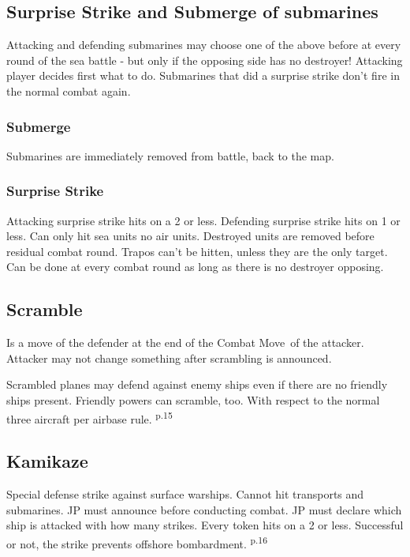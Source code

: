 \documentclass[10pt,a4paper,landscape]{article}
\begin{document}
\begin{multicols*}{3}
\subsection*{Surprise Strike and Submerge of submarines}
Attacking and defending submarines may choose one of the above before at every round of the sea battle - but only if the opposing side has no destroyer! Attacking player decides first what to do. Submarines that did a surprise strike don't fire in the normal combat again.

\subsubsection*{Submerge}
Submarines are immediately removed from battle, back to the map.

\subsubsection*{Surprise Strike}
Attacking surprise strike hits on a 2 or less. Defending surprise strike hits on 1 or less. Can only hit sea units no air units. Destroyed units are removed before residual combat round. Trapos can't be hitten, unless they are the only target. Can be done at every combat round as long as there is no destroyer opposing.

\subsection*{Scramble}
Is a move of the defender at the end of the \glqq Combat Move\grqq\ of the attacker. Attacker may not change something after scrambling is announced.

Scrambled planes may defend against enemy ships even if there are no friendly ships present. Friendly powers can scramble, too. With respect to the normal three aircraft per airbase rule. \textsuperscript{p.15}

\subsection*{Kamikaze}
Special defense strike against surface warships. Cannot hit transports and submarines. JP must announce before conducting combat. JP must declare which ship is attacked with how many strikes. Every token hits on a 2 or less. Successful or not, the strike prevents offshore bombardment. \textsuperscript{p.16}


\end{multicols*}
\end{document}
